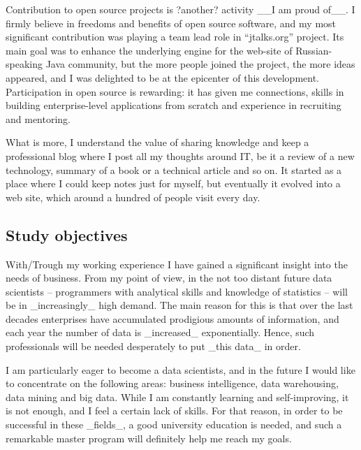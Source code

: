 \documentclass[a4paper,14pt]{extarticle}
\begin{document}
Contribution to open source projects is ?another? activity __I am proud of__. I firmly believe in freedoms and benefits of open source software, and my most significant contribution was playing a team lead role in ``jtalks.org'' project. Its main goal was to enhance the underlying engine for the web-site of Russian-speaking Java community, but the more people joined the project, the more ideas appeared, and I was delighted to be at the epicenter of this development. Participation in open source is rewarding: it has given me connections, skills in building enterprise-level applications from scratch and experience in recruiting and mentoring.

What is more, I understand the value of sharing knowledge and keep a professional blog where I post all my thoughts around IT, be it a review of a new technology, summary of a book or a technical article and so on. It started as a place where I could keep notes just for myself, but eventually it evolved into a web site, which around a hundred of people visit every day.


\subsection*{Study objectives}

With/Trough my working experience I have gained a significant insight into the needs of business. From my point of view, in the not too distant future data scientists -- programmers with analytical skills and knowledge of statistics -- will be in _increasingly_ high demand. The main reason for this is that over the last decades enterprises have accumulated prodigious amounts of information, and each year the number of data is _increased_ exponentially. Hence, such professionals will be needed desperately to put _this data_ in order.

I am particularly eager to become a data scientists, and in the future I would like to concentrate on the following areas: business intelligence, data warehousing, data mining and big data. While I am constantly learning and self-improving, it is not enough, and I feel a certain lack of skills. For that reason, in order to be successful in these _fields_, a good university education is needed, and such a remarkable master program will definitely help me reach my goals.
\end{document}

